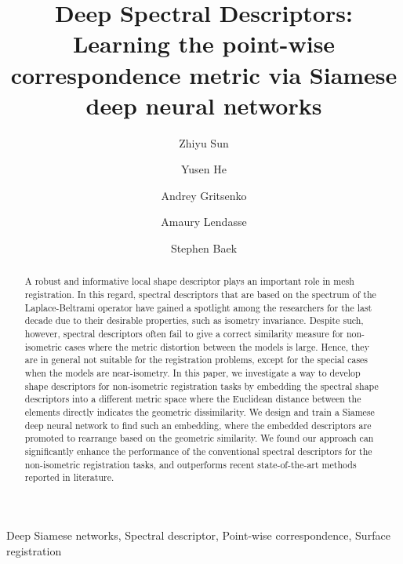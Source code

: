 \documentclass[5p,twocolumn,10pt,times]{elsarticle}
\begin{document}
\baselineskip11pt

\begin{frontmatter}

\title{Deep Spectral Descriptors: Learning the point-wise correspondence metric via Siamese deep neural networks}


\author{Zhiyu Sun}
\author{Yusen He}
\author{Andrey Gritsenko}
\author{Amaury Lendasse}
\author{Stephen Baek}
\address{Department of Mechanical and Industrial Engineering, The University of Iowa, IA, United States}


\begin{abstract} 
A robust and informative local shape descriptor plays an important role in mesh registration. In this regard, spectral descriptors that are based on the spectrum of the Laplace-Beltrami operator have gained a spotlight among the researchers for the last decade due to their desirable properties, such as isometry invariance. Despite such, however, spectral descriptors often fail to give a correct similarity measure for non-isometric cases where the metric distortion between the models is large. Hence, they are in general not suitable for the registration problems, except for the special cases when the models are near-isometry. In this paper, we investigate a way to develop shape descriptors for non-isometric registration tasks by embedding the spectral shape descriptors into a different metric space where the Euclidean distance between the elements directly indicates the geometric dissimilarity. We design and train a Siamese deep neural network to find such an embedding, where the embedded descriptors are promoted to rearrange based on the geometric similarity. We found our approach can significantly enhance the performance of the conventional spectral descriptors for the non-isometric registration tasks, and outperforms recent state-of-the-art methods reported in literature.
\end{abstract}

\begin{keyword} Deep Siamese networks, Spectral descriptor, Point-wise correspondence, Surface registration
\end{keyword}

\end{frontmatter}
\end{document}
